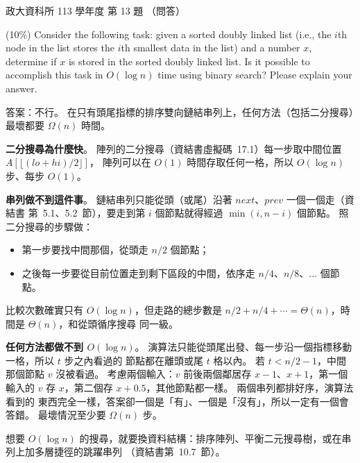 \begin{pastexam}[label={px:nccu-113-dsa-13}]{政大資科所 113 學年度 第 13 題}
（問答）

(10\%) Consider the following task: given a sorted doubly linked list (i.e., the $i$th node in the list
stores the $i$th smallest data in the list) and a number $x$, determine if $x$ is stored in the sorted
doubly linked list. Is it possible to accomplish this task in $O(\log n)$ time using binary search? Please
explain your answer.
\end{pastexam}

\begin{pastsoln}
答案：不行。 在只有頭尾指標的排序雙向鏈結串列上，任何方法（包括二分搜尋）最壞都要 $\Omega(n)$ 時間。

\textbf{二分搜尋為什麼快}。 陣列的二分搜尋（資結書虛擬碼~17.1）每一步取中間位置 $A[\lfloor (lo + hi)/2 \rfloor]$，
陣列可以在 $O(1)$ 時間存取任何一格，所以 $O(\log n)$ 步、每步 $O(1)$。

\textbf{串列做不到這件事}。 鏈結串列只能從頭（或尾）沿著 $\mathit{next}$、$\mathit{prev}$ 一個一個走（資結書
第~5.1、5.2~節），要走到第 $i$ 個節點就得經過 $\min(i, n - i)$ 個節點。 照二分搜尋的步驟做：
\begin{itemize}
\item 第一步要找中間那個，從頭走 $n/2$ 個節點；
\item 之後每一步要從目前位置走到剩下區段的中間，依序走 $n/4$、$n/8$、$\ldots$ 個節點。
\end{itemize}
比較次數確實只有 $O(\log n)$，但走路的總步數是 $n/2 + n/4 + \cdots = \Theta(n)$，時間是 $\Theta(n)$，和從頭循序搜尋
同一級。

\textbf{任何方法都做不到 $O(\log n)$}。 演算法只能從頭尾出發、每一步沿一個指標移動一格，所以 $t$ 步之內看過的
節點都在離頭或尾 $t$ 格以內。 若 $t < n/2 - 1$，中間那個節點 $v$ 沒被看過。 考慮兩個輸入：$v$ 前後兩個鄰居存
$x - 1$、$x + 1$，第一個輸入的 $v$ 存 $x$，第二個存 $x + 0.5$，其他節點都一樣。 兩個串列都排好序，演算法看到的
東西完全一樣，答案卻一個是「有」、一個是「沒有」，所以一定有一個會答錯。 最壞情況至少要 $\Omega(n)$ 步。

想要 $O(\log n)$ 的搜尋，就要換資料結構：排序陣列、平衡二元搜尋樹，或在串列上加多層捷徑的跳躍串列
（資結書第~10.7~節）。
\end{pastsoln}
